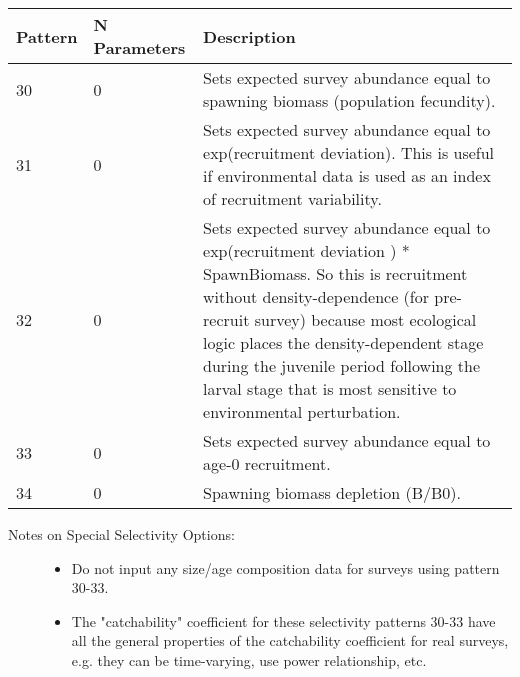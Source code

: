 \begin{center}
\begin{longtable}{p{2cm} p{3cm} p{10cm}}
		Pattern & N Parameters & Description \\
		\hline
		30 & 0 & Sets expected survey abundance equal to spawning biomass (population fecundity). \\
		31 & 0 & Sets expected survey abundance equal to exp(recruitment deviation).  This is useful if environmental data is used as an index of recruitment variability. \\
		32 & 0 & Sets expected survey abundance equal to exp(recruitment deviation ) * SpawnBiomass.  So this is recruitment without density-dependence (for pre-recruit survey) because most ecological logic places the density-dependent stage during the juvenile period following the larval stage that is most sensitive to environmental perturbation.\\
		33 & 0 & Sets expected survey abundance equal to age-0 recruitment.\\
		34 & 0 & Spawning biomass depletion (B/B0).\\
		\hline
	\end{longtable}
\end{center}

\begin{description}
	\item[Notes on Special Selectivity Options:]\hfil
	\begin{itemize}
		\item Do not input any size/age composition data for surveys using pattern 30-33.
		\item The "catchability" coefficient for these selectivity patterns 30-33 have all the general properties of the catchability coefficient for real surveys, e.g. they can be time-varying, use power relationship, etc.
	\end{itemize}
\end{description}

